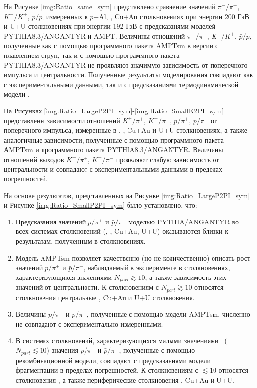 На Рисунке \ref{img:Ratio_same_sym} представлено сравнение значений $\pi^{-}/\pi^{+}$, $K^{-}/K^{+}$, $\bar{p}/p$, измеренных в $p$+Al, \heau, Cu+Au столкновениях при энергии 200 ГэВ и U+U столкновениях при энергии 192 ГэВ с предсказанями моделей PYTHIA8.3/ANGANTYR и AMPT. Величины отношений $\pi^{-}/\pi^{+}$, $K^{-}/K^{+}$, $\bar{p}/p$, полученные как с помощью программного пакета AMPTsm в версии с плавлением струн, так и с помощью программного пакета PYTHIA8.3/ANGANTYR не проявляют значимую зависимость от поперечного импульса и центральности. Полученные результаты моделирования совпадают как с экспериментальными данными, так и с предсказаниями термодинамической модели \cite{PPG026, ThermalisationRHIC}.

На Рисунках \ref{img:Ratio_LargeP2PI_sym}-\ref{img:Ratio_SmallK2PI_sym} представлены зависимости отношений $K^{+}/\pi^{+}$, $K^{-}/\pi^{-}$, $p/\pi^{+}$, $\bar{p}/\pi^{-}$ от поперечного импульса, измеренные в \pal, \heau, Cu+Au и U+U столкновениях, а также аналогичные зависимости, полученные с помощью программного пакета АMPTsm и  программного пакета PYTHIA8.3/ANGANTYR.
Величины отношений выходов $K^{+}/\pi^{+}$, $K^{-}/\pi^{-}$ проявляют слабую зависимость от центральности и совпадают с экспериментальными данными в пределах погрешностей. 

На основе результатов, представленных на Рисунке \ref{img:Ratio_LargeP2PI_sym} и Рисунке \ref{img:Ratio_SmallP2PI_sym} было установлено, что:

\begin{enumerate}
\item Предсказания значений $p/\pi^{+}$ и $\bar{p}/\pi^{-}$ моделью PYTHIA/ANGANTYR во всех системах столкновений (\pal, \heau, Cu+Au, U+U) оказываются близки к результатам, полученным в \pp столкновениях. 
\item Модель AMPTsm позволяет качественно (но не количественно) описать рост значений $p/\pi^{+}$ и $\bar{p}/\pi^{-}$, наблюдаемый в эксперименте в столкновениях, характеризующихся значениями $N_{part} \gtrsim 10$, а также зависимость этих значений от центральности. К столкновениям с $N_{part} \gtrsim 10$ относятся столкновения центральные \heau, Cu+Au и U+U столкновения.
\item Величины $p/\pi^{+}$ и $\bar{p}/\pi^{-}$, полученные с помощью модели AMPTsm, численно не совпадают с экспериментально измеренными.
\item В системах столкновений, характеризующихся малыми значениями \Npart \ ($N_{part} \lesssim 10$) значения $p/\pi^{+}$ и $\bar{p}/\pi^{-}$, полученные с помощью рекомбинационной модели, совпадают с предсказаниями модели фрагментации в пределах погрешностей. К столкновениям с \Npart $\lesssim 10$ относятся столкновения \pal, а также периферические столкновения \heau, Cu+Au и U+U.
\end{enumerate}

